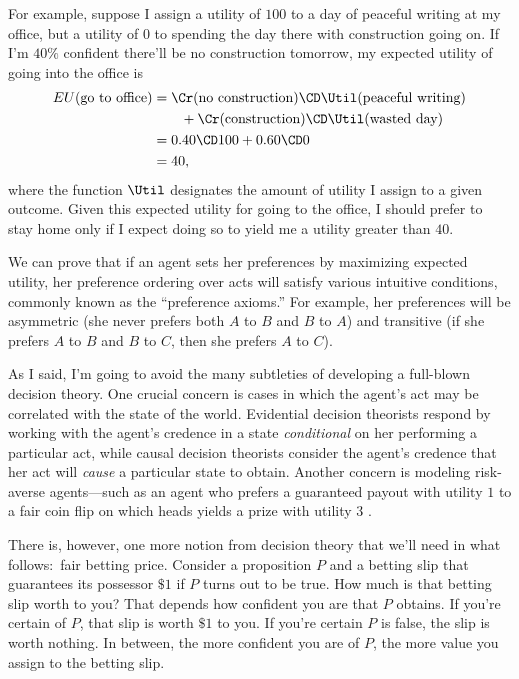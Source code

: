 For example, suppose I assign a utility of $100$ to a day of peaceful writing at my office, but a utility of $0$ to spending the day there with construction going on. If I'm $40\%$ confident there'll be no construction tomorrow, my expected utility of going into the office is
\begin{equation}
\begin{aligned}
EU(\text{go to office}) &= \Cr(\text{no construction}) \CD \Util(\text{peaceful writing})\\
                        &\qquad + \Cr(\text{construction}) \CD \Util(\text{wasted day})\\
						&= 0.40 \CD 100 + 0.60 \CD 0\\
						&= 40,
\end{aligned}
\end{equation}
where the function $\Util$ designates the amount of utility I assign to a given outcome. Given this expected utility for going to the office, I should prefer to stay home only if I expect doing so to yield me a utility greater than $40$. 

We can prove that if an agent sets her preferences by maximizing expected utility, her preference ordering over acts will satisfy various intuitive conditions, commonly known as the ``preference axioms.'' For example, her preferences will be asymmetric (she never prefers both $A$ to $B$ and $B$ to $A$) and transitive (if she prefers $A$ to $B$ and $B$ to $C$, then she prefers $A$ to $C$).

As I said, I'm going to avoid the many subtleties of developing a full-blown decision theory. One crucial concern is cases in which the agent's act may be correlated with the state of the world. Evidential decision theorists \citep{JeffreyLogic} respond by working with the agent's credence in a state \emph{conditional} on her performing a particular act, while causal decision theorists \citep{GibbardHarper,LewisCausal,JoyceCausal,WeirichCausal} consider the agent's credence that her act will \emph{cause} a particular state to obtain. Another concern is modeling risk-averse agents---such as an agent who prefers a guaranteed payout with utility $1$ to a fair coin flip on which heads yields a prize with utility $3$ \citep{Allais,BuchakRisk}.

There is, however, one more notion from decision theory that we'll need in what follows:\ fair betting price. Consider a proposition $P$ and a betting slip that guarantees its possessor $\$1$ if $P$ turns out to be true. How much is that betting slip worth to you? That depends how confident you are that $P$ obtains. If you're certain of $P$, that slip is worth $\$1$ to you. If you're certain $P$ is false, the slip is worth nothing. In between, the more confident you are of $P$, the more value you assign to the betting slip.

